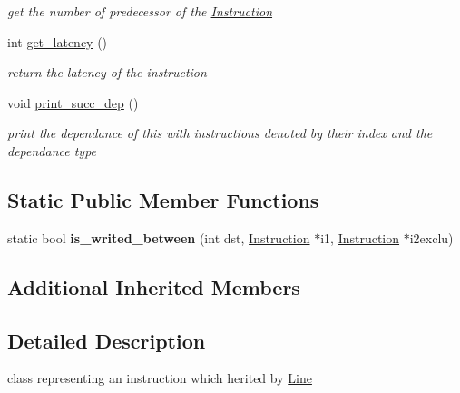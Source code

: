 \begin{DoxyCompactItemize}
\begin{DoxyCompactList}\small\item\em get the number of predecessor of the \hyperlink{class_instruction}{Instruction} \end{DoxyCompactList}\item 
\hypertarget{class_instruction_ac2988d2fb858b720e009da03120ae4c7}{int \hyperlink{class_instruction_ac2988d2fb858b720e009da03120ae4c7}{get\+\_\+latency} ()}\label{class_instruction_ac2988d2fb858b720e009da03120ae4c7}

\begin{DoxyCompactList}\small\item\em return the latency of the instruction \end{DoxyCompactList}\item 
\hypertarget{class_instruction_af489e680ae3c69fd12b0a23e959172e5}{void \hyperlink{class_instruction_af489e680ae3c69fd12b0a23e959172e5}{print\+\_\+succ\+\_\+dep} ()}\label{class_instruction_af489e680ae3c69fd12b0a23e959172e5}

\begin{DoxyCompactList}\small\item\em print the dependance of this with instructions denoted by their index and the dependance type \end{DoxyCompactList}\end{DoxyCompactItemize}
\subsection*{Static Public Member Functions}
\begin{DoxyCompactItemize}
\item 
\hypertarget{class_instruction_ae309ff37d134500f75e1180182b02a6b}{static bool {\bfseries is\+\_\+writed\+\_\+between} (int dst, \hyperlink{class_instruction}{Instruction} $\ast$i1, \hyperlink{class_instruction}{Instruction} $\ast$i2exclu)}\label{class_instruction_ae309ff37d134500f75e1180182b02a6b}

\end{DoxyCompactItemize}
\subsection*{Additional Inherited Members}


\subsection{Detailed Description}
class representing an instruction which herited by \hyperlink{class_line}{Line} 

